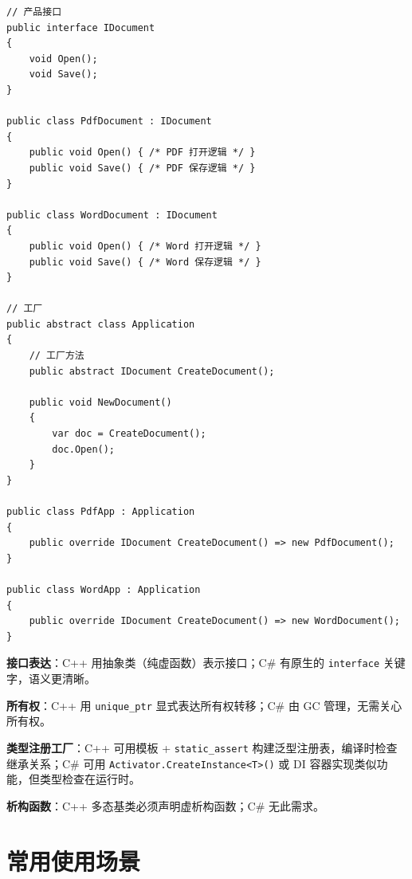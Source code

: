 \documentclass[12pt,a4paper,fontset=fandol]{ctexbook}
\begin{document}
\begin{lstlisting}[style=csharpstyle, caption={工厂方法模式 --- C\# 实现}]
// 产品接口
public interface IDocument
{
    void Open();
    void Save();
}

public class PdfDocument : IDocument
{
    public void Open() { /* PDF 打开逻辑 */ }
    public void Save() { /* PDF 保存逻辑 */ }
}

public class WordDocument : IDocument
{
    public void Open() { /* Word 打开逻辑 */ }
    public void Save() { /* Word 保存逻辑 */ }
}

// 工厂
public abstract class Application
{
    // 工厂方法
    public abstract IDocument CreateDocument();

    public void NewDocument()
    {
        var doc = CreateDocument();
        doc.Open();
    }
}

public class PdfApp : Application
{
    public override IDocument CreateDocument() => new PdfDocument();
}

public class WordApp : Application
{
    public override IDocument CreateDocument() => new WordDocument();
}
\end{lstlisting}

\begin{compare}
\textbf{接口表达}：C++ 用抽象类（纯虚函数）表示接口；C\# 有原生的 \texttt{interface} 关键字，语义更清晰。

\textbf{所有权}：C++ 用 \texttt{unique\_ptr} 显式表达所有权转移；C\# 由 GC 管理，无需关心所有权。

\textbf{类型注册工厂}：C++ 可用模板 + \texttt{static\_assert} 构建泛型注册表，编译时检查继承关系；C\# 可用 \texttt{Activator.CreateInstance<T>()} 或 DI 容器实现类似功能，但类型检查在运行时。

\textbf{析构函数}：C++ 多态基类必须声明虚析构函数；C\# 无此需求。
\end{compare}

\section{常用使用场景}
\end{document}
